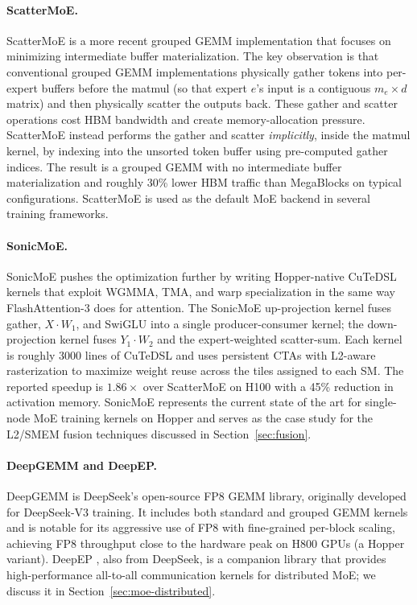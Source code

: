 \documentclass[10pt]{article}
\begin{document}
\paragraph{ScatterMoE.}
ScatterMoE \citep{tan2024scattermoe} is a more recent grouped GEMM implementation that focuses on minimizing intermediate buffer materialization. The key observation is that conventional grouped GEMM implementations physically gather tokens into per-expert buffers before the matmul (so that expert $e$'s input is a contiguous $m_e \times d$ matrix) and then physically scatter the outputs back. These gather and scatter operations cost HBM bandwidth and create memory-allocation pressure. ScatterMoE instead performs the gather and scatter \emph{implicitly}, inside the matmul kernel, by indexing into the unsorted token buffer using pre-computed gather indices. The result is a grouped GEMM with no intermediate buffer materialization and roughly 30\% lower HBM traffic than MegaBlocks on typical configurations. ScatterMoE is used as the default MoE backend in several training frameworks.

\paragraph{SonicMoE.}
SonicMoE \citep{sonicmoe2025} pushes the optimization further by writing Hopper-native CuTeDSL kernels that exploit WGMMA, TMA, and warp specialization in the same way FlashAttention-3 does for attention. The SonicMoE up-projection kernel fuses gather, $X \cdot W_1$, and SwiGLU into a single producer-consumer kernel; the down-projection kernel fuses $Y_1 \cdot W_2$ and the expert-weighted scatter-sum. Each kernel is roughly 3000 lines of CuTeDSL and uses persistent CTAs with L2-aware rasterization to maximize weight reuse across the tiles assigned to each SM. The reported speedup is $1.86\times$ over ScatterMoE on H100 with a 45\% reduction in activation memory. SonicMoE represents the current state of the art for single-node MoE training kernels on Hopper and serves as the case study for the L2/SMEM fusion techniques discussed in Section~\ref{sec:fusion}.

\paragraph{DeepGEMM and DeepEP.}
DeepGEMM \citep{deepgemm2024} is DeepSeek's open-source FP8 GEMM library, originally developed for DeepSeek-V3 training. It includes both standard and grouped GEMM kernels and is notable for its aggressive use of FP8 with fine-grained per-block scaling, achieving FP8 throughput close to the hardware peak on H800 GPUs (a Hopper variant). DeepEP \citep{deepep2024}, also from DeepSeek, is a companion library that provides high-performance all-to-all communication kernels for distributed MoE; we discuss it in Section~\ref{sec:moe-distributed}.
\end{document}
